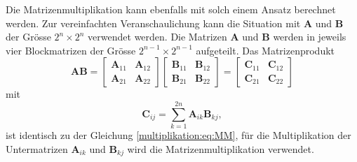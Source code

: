 Die Matrizenmultiplikation kann ebenfalls mit solch einem Ansatz berechnet werden.
Zur vereinfachten Veranschaulichung kann die Situation mit $\mathbf{A}$ und $\mathbf{B}$ der Gr\"osse $2^n \times 2^n$ verwendet werden.
Die Matrizen $\mathbf{A}$ und $\mathbf{B}$ werden in jeweils vier Blockmatrizen der Gr\"osse $2^{n-1} \times 2^{n-1}$ aufgeteilt.
Das Matrizenprodukt
\begin{equation}
\mathbf{A}\mathbf{B}=
\begin{bmatrix}
\mathbf{A}_{11} & \mathbf{A}_{12}\\
\mathbf{A}_{21} & \mathbf{A}_{22}
\end{bmatrix}
\begin{bmatrix}
\mathbf{B}_{11} & \mathbf{B}_{12}\\
\mathbf{B}_{21} & \mathbf{B}_{22}
\end{bmatrix}
=
\begin{bmatrix}
\mathbf{C}_{11} & \mathbf{C}_{12}\\
\mathbf{C}_{21} & \mathbf{C}_{22}
\end{bmatrix}
\end{equation}
mit \begin{equation}
\mathbf{C}_{ij} = \sum_{k=1}^{2n} \mathbf{A}_{ik} \mathbf{B}_{kj},
\label{multiplikation:eq:MM_block}
\end{equation}
ist identisch zu der Gleichung \eqref{multiplikation:eq:MM}, f\"ur die Multiplikation der Untermatrizen $\mathbf{A}_{ik}$ und $\mathbf{B}_{kj}$ wird die Matrizenmultiplikation verwendet.

